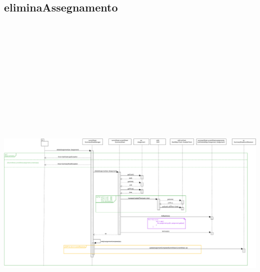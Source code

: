 \subsection{eliminaAssegnamento}
\centering\includegraphics[max width=\textwidth, max height=190mm]{../resources/img/GCC/DSD/op5b.png}